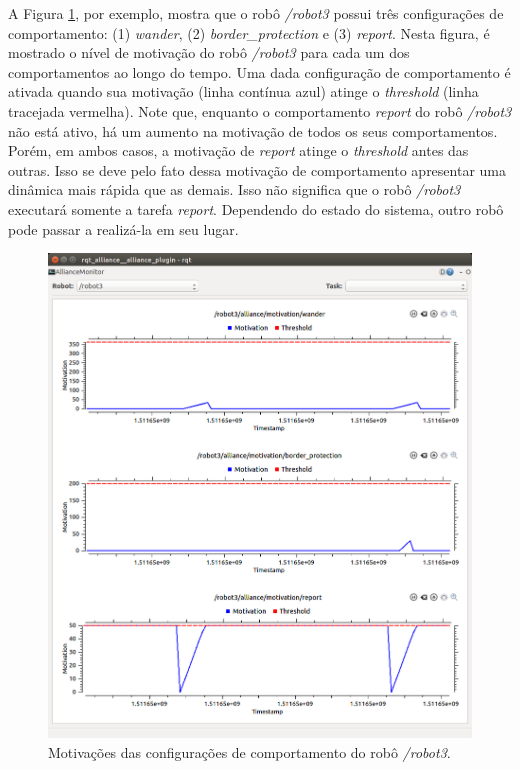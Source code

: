             A Figura \ref{fig:rqt_alliance_motivations}, por exemplo, mostra que o robô \textit{/robot3} possui três configurações de comportamento: (1) \textit{wander}, (2) \textit{border\_protection} e (3) \textit{report}. Nesta figura, é mostrado o nível de motivação do robô \textit{/robot3} para cada um dos comportamentos ao longo do tempo. Uma dada configuração de comportamento é ativada quando sua motivação (linha contínua azul) atinge o \textit{threshold} (linha tracejada vermelha). Note que, enquanto o comportamento \textit{report} do robô \textit{/robot3} não está ativo, há um aumento na motivação de todos os seus comportamentos. Porém, em ambos casos, a motivação de \textit{report} atinge o \textit{threshold} antes das outras. Isso se deve pelo fato dessa motivação de comportamento apresentar uma dinâmica mais rápida que as demais. Isso não significa que o robô \textit{/robot3} executará somente a tarefa \textit{report}. Dependendo do estado do sistema, outro robô pode passar a realizá-la em seu lugar.
            
            \begin{figure}
                \centering
                \includegraphics[width=\textwidth]{Figuras/4_resultados/rqt_alliance4.png}
                \caption{Motivações das configurações de comportamento do robô \textit{/robot3}.}
                \label{fig:rqt_alliance_motivations}
            \end{figure}
            
